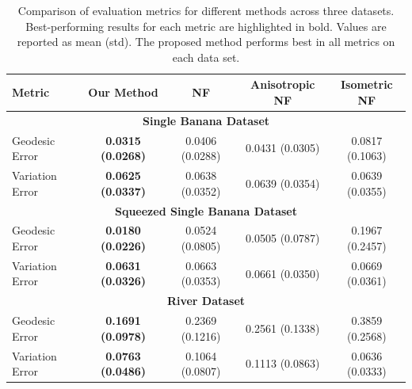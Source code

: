 \begin{table}[t!]
    \centering
    \begin{tabular}{lcccc}
    \hline
    \textbf{Metric} & \textbf{Our Method} & \textbf{NF} & \textbf{Anisotropic NF} & \textbf{Isometric NF} \\
    \hline
    \multicolumn{5}{c}{\textbf{Single Banana Dataset}} \\
    \hline
    Geodesic Error & \textbf{0.0315 (0.0268)} & 0.0406 (0.0288) & 0.0431 (0.0305) & 0.0817 (0.1063) \\
    Variation Error & \textbf{0.0625 (0.0337)} & 0.0638 (0.0352) & 0.0639 (0.0354) & 0.0639 (0.0355) \\
    \hline
    \multicolumn{5}{c}{\textbf{Squeezed Single Banana Dataset}} \\
    \hline
    Geodesic Error & \textbf{0.0180 (0.0226)} & 0.0524 (0.0805) & 0.0505 (0.0787) & 0.1967 (0.2457) \\
    Variation Error & \textbf{0.0631 (0.0326)} & 0.0663 (0.0353) & 0.0661 (0.0350) & 0.0669 (0.0361) \\
    \hline
    \multicolumn{5}{c}{\textbf{River Dataset}} \\
    \hline
    Geodesic Error & \textbf{0.1691 (0.0978)} & 0.2369 (0.1216) & 0.2561 (0.1338) & 0.3859 (0.2568) \\
    Variation Error & \textbf{0.0763 (0.0486)} & 0.1064 (0.0807) & 0.1113 (0.0863) & 0.0636 (0.0333) \\
    \hline
    \end{tabular}
    \caption{Comparison of evaluation metrics for different methods across three datasets. Best-performing results for each metric are highlighted in bold. Values are reported as mean (std). The proposed method performs best in all metrics on each data set.}
    \label{tab:geodesic-variation-errors}
    \end{table}

